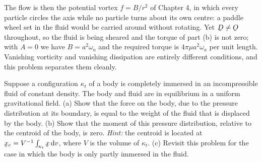 \begin{solution}
The flow is then the potential vortex $f=B/r^{2}$ of Chapter 4, in which
every particle circles the axis while no particle turns about its own
centre: a paddle wheel set in the fluid would be carried around without
rotating. Yet $\bD\neq\Ob$ throughout, so the fluid is being sheared and
the torque of part (b) is not zero; with $A=0$ we have
$B=a^{2}\omega_{a}$ and the required torque is $4\pi\mu a^{2}\omega_{a}$
per unit length. Vanishing vorticity and vanishing dissipation are
entirely different conditions, and this problem separates them cleanly.
\end{solution}

\begin{problem}[Archimedes]
Suppose a configuration $\kappa_{t}$ of a body is completely immersed in
an incompressible fluid of constant density. The body and fluid are in
equilibrium in a uniform gravitational field.
(a) Show that the force on the body, due to the pressure distribution at
its boundary, is equal to the weight of the fluid that is displaced by
the body.
(b) Show that the moment of this pressure distribution, relative to the
centroid of the body, is zero. \emph{Hint:} the centroid is located at
$\bx_{c}=V^{-1}\int_{\kappa_{t}}\bx\,\dl v$, where $V$ is the volume of
$\kappa_{t}$.
(c) Revisit this problem for the case in which the body is only partly
immersed in the fluid.
\end{problem}

